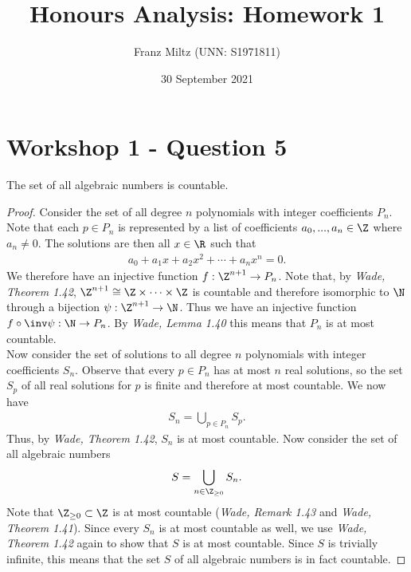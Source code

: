 \documentclass{article}
\begin{document}
\title{Honours Analysis: Homework 1}
\author{Franz Miltz (UNN: S1971811)}
\date{30 September 2021}
\maketitle

\section{Workshop 1 - Question 5}

\begin{claim}
   The set of all algebraic numbers is countable.
   \begin{proof}
      Consider the set of all degree $n$ polynomials with integer coefficients $P_n$.
      Note that each $p\in P_n$ is represented by a list of coefficients
      $a_0, ..., a_n\in\Z$ where $a_n\not=0$. The solutions are then all $x\in\R$
      such that
      \begin{align*}
         a_0 + a_1 x + a_2 x^2 + \cdots + a_n x^n = 0.
      \end{align*}
      We therefore have an injective function $f:\Z^{n+1}\to P_n$.
      Note that, by \emph{Wade, Theorem 1.42}, $\Z^{n+1}\cong \Z \times \cdots \times \Z$ is countable and therefore isomorphic to $\N$
      through a bijection $\psi:\Z^{n+1}\to\N$. Thus we have an injective
      function $f\circ\inv\psi:\N\to P_n$.
      By \emph{Wade, Lemma 1.40} this means that $P_n$ is at most countable.\\
      Now consider the set of solutions to all degree $n$ polynomials with 
      integer coefficients $S_n$. Observe that every $p\in P_n$ has at most
      $n$ real solutions, so the set $S_p$ of all real solutions for $p$ is
      finite and therefore at most countable.
      We now have 
      \begin{align*}
         S_n = \bigcup_{p\in P_n} S_p.
      \end{align*}
      Thus, by \emph{Wade, Theorem 1.42}, $S_n$ is at most countable.
      Now consider the set of all algebraic numbers
      \begin{align*}
         S = \bigcup_{n\in\Z_{\geq 0}}S_n.
      \end{align*}
      Note that $\Z_{\geq 0}\subset \Z$ is at most countable
      (\emph{Wade, Remark 1.43} and \emph{Wade, Theorem 1.41}). Since
      every $S_n$ is at most countable as well, we use \emph{Wade, Theorem 1.42}
      again to show that $S$ is at most countable.
      Since $S$ is trivially infinite, this means that the set $S$ of
      all algebraic numbers is in fact countable.
   \end{proof}
\end{claim}
\end{document}

